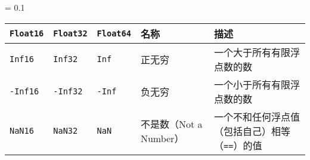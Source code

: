 
\begin{table}[h]
  \centering
  \tymin = 0.1\textwidth
\begin{tabulary}{\linewidth}{|L|L|L|L|L|}
  \hline
  \texttt{Float16} & \texttt{Float32} & \texttt{Float64} & 名称 & 描述 \\ \hline
  \texttt{Inf16} & \texttt{Inf32} & \texttt{Inf} & 正无穷 & 一个大于所有有限浮点数的数 \\ \hline
  \texttt{-Inf16} & \texttt{-Inf32} & \texttt{-Inf} & 负无穷 & 一个小于所有有限浮点数的数 \\ \hline
  \texttt{NaN16} & \texttt{NaN32} & \texttt{NaN} & 不是数\newline （Not a Number） & 一个不和任何浮点值（包括自己）相等（\texttt{==}）的值 \\
  \hline
\end{tabulary}
\end{table}
